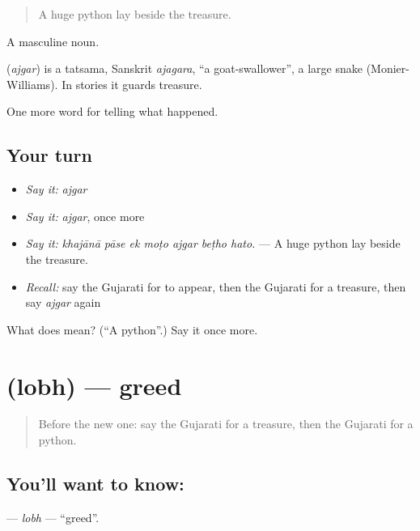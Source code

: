 \begin{quote}
A huge python lay beside the treasure.
\end{quote}

A masculine noun.

\begin{cousinweb}
\textbf{} (\emph{ajgar}) is a tatsama, Sanskrit \emph{ajagara}, \textquotedblleft{}a goat-swallower\textquotedblright{}, a large snake (Monier-Williams). In stories it guards treasure.
\end{cousinweb}

\begin{grammarlens}[title={What you've built}]
One more word for telling what happened.
\end{grammarlens}

\subsection*{Your turn}
\begin{itemize}
\raggedright
  \item \emph{Say it:} \emph{ajgar}
  \item \emph{Say it:} \emph{ajgar}, once more
  \item \emph{Say it:} \emph{khajānā pāse ek moṭo ajgar beṭho hato.} — A huge python lay beside the treasure.
  \item \emph{Recall:} say the Gujarati for to appear, then the Gujarati for a treasure, then say \emph{ajgar} again
\end{itemize}

\begin{tcolorbox}[breakable,colback=teal!4,colframe=teal!35!black,title={Before you move on}]
What does  mean? (\textquotedblleft{}A python\textquotedblright{}.) Say it once more.
\end{tcolorbox}
\section[\texorpdfstring{\gu{લોભ} (lobh)}{લોભ (lobh)}]{ (lobh) — greed}

\label{lesson:GU-C334-lobh}



\begin{quote}
Before the new one: say the Gujarati for a treasure, then the Gujarati for a python.
\end{quote}

\subsection*{You'll want to know: }
\textbf{} — \emph{lobh} — \textquotedblleft{}greed\textquotedblright{}.

